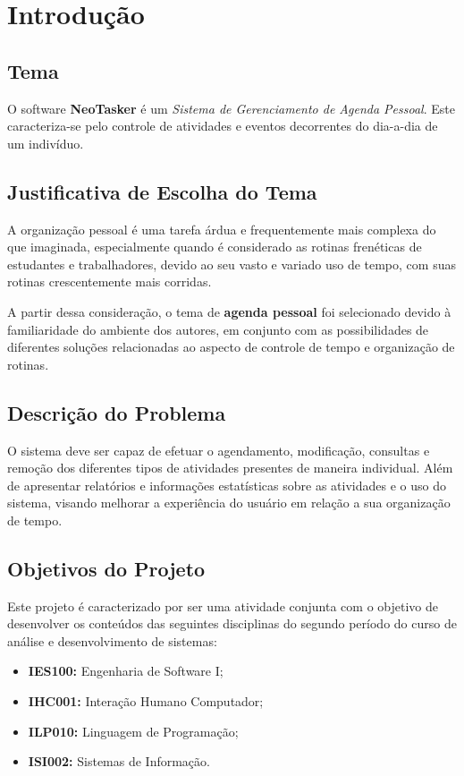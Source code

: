 \documentclass[a4paper,12pt]{article}
\begin{document}
\setcounter{tocdepth}{4}
\tableofcontents
\pagebreak

\listoffigures
\pagebreak

\section{Introdução}
\subsection{Tema}
O software \textbf{NeoTasker} é um \textit{Sistema de Gerenciamento de Agenda Pessoal}. Este caracteriza-se pelo controle de atividades 
e eventos decorrentes do dia-a-dia de um indivíduo.

\subsection{Justificativa de Escolha do Tema}
A organização pessoal é uma tarefa árdua e frequentemente mais complexa do que imaginada, especialmente quando é considerado as rotinas 
frenéticas de estudantes e trabalhadores, devido ao seu vasto e variado uso de tempo, com suas rotinas crescentemente mais corridas.

A partir dessa consideração, o tema de \textbf{agenda pessoal} foi selecionado devido à familiaridade do ambiente dos autores, em 
conjunto com as possibilidades de diferentes soluções relacionadas ao aspecto de controle de tempo e organização de rotinas.

\subsection{Descrição do Problema}
O sistema deve ser capaz de efetuar o agendamento, modificação, consultas e remoção dos diferentes tipos de atividades presentes 
de maneira individual. Além de apresentar relatórios e informações estatísticas sobre as atividades e o uso do sistema, visando 
melhorar a experiência do usuário em relação a sua organização de tempo.

\subsection{Objetivos do Projeto}
Este projeto é caracterizado por ser uma atividade conjunta com o objetivo de desenvolver os conteúdos das seguintes 
disciplinas do segundo período do curso de análise e desenvolvimento de sistemas:
\begin{itemize}
    \item \textbf{IES100:} Engenharia de Software I;
    \item \textbf{IHC001:} Interação Humano Computador;
    \item \textbf{ILP010:} Linguagem de Programação;
    \item \textbf{ISI002:} Sistemas de Informação.
\end{itemize}
\end{document}
